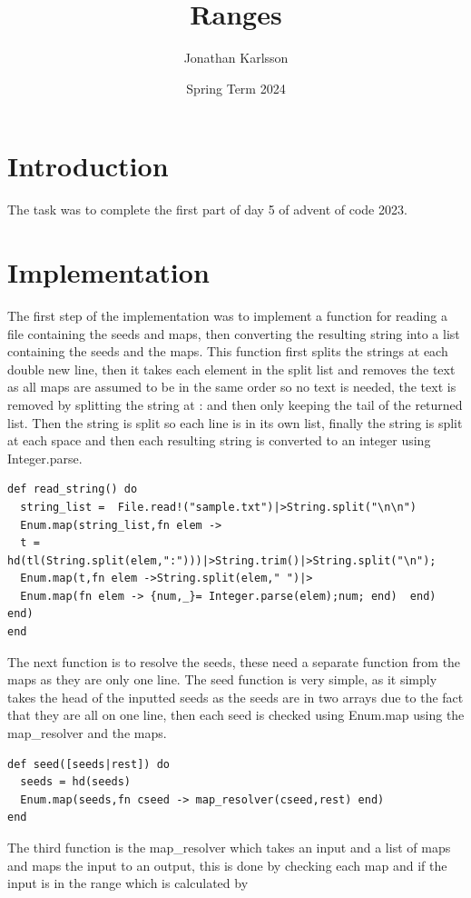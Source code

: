 \documentclass[a4paper,11pt]{article}
\begin{document}
\title{
    \textbf{Ranges}
}
\author{Jonathan Karlsson}
\date{Spring Term 2024}

\maketitle

\section*{Introduction}

The task was to complete the first part of day 5 of advent of code 2023. 

\section*{Implementation}
The first step of the implementation was to implement a function for reading a file containing the seeds and maps, then converting the resulting string into a list containing the seeds and the maps. 
This function first splits the strings at each double new line, then it takes each element in the split list and removes the text as all maps are assumed to be in the same order so no text is needed, the text is removed by splitting the string at : and then only keeping the tail of the returned list. 
Then the string is split so each line is in its own list, finally the string is split at each space and then each resulting string is converted to an integer using Integer.parse.
\begin{verbatim}
def read_string() do
  string_list =  File.read!("sample.txt")|>String.split("\n\n")
  Enum.map(string_list,fn elem -> 
  t = hd(tl(String.split(elem,":")))|>String.trim()|>String.split("\n");
  Enum.map(t,fn elem ->String.split(elem," ")|>
  Enum.map(fn elem -> {num,_}= Integer.parse(elem);num; end)  end) end)
end
\end{verbatim}
The next function is to resolve the seeds, these need a separate function from the maps as they are only one line. 
The seed function is very simple, as it simply takes the head of the inputted seeds as the seeds are in two arrays due to the fact that they are all on one line, 
then each seed is checked using Enum.map using the map\_resolver and the maps. 
\begin{verbatim}
def seed([seeds|rest]) do
  seeds = hd(seeds)
  Enum.map(seeds,fn cseed -> map_resolver(cseed,rest) end)
end
\end{verbatim}
The third function is the map\_resolver which takes an input and a list of maps and maps the input to an output, this is done by checking each map and if the input is in the range which is calculated by 
\end{document}
